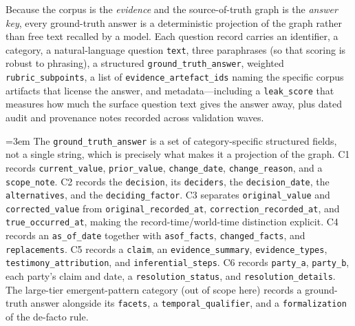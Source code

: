 Because the corpus is the \emph{evidence} and the source-of-truth graph is the
\emph{answer key}, every ground-truth answer is a deterministic projection of the
graph rather than free text recalled by a model. Each question record carries an
identifier, a category, a natural-language question \texttt{text}, three
paraphrases (so that scoring is robust to phrasing), a structured
\texttt{ground\_truth\_answer}, weighted \texttt{rubric\_subpoints}, a list of
\texttt{evidence\_artefact\_ids} naming the specific corpus artifacts that
license the answer, and metadata---including a \texttt{leak\_score} that measures
how much the surface question text gives the answer away, plus dated audit and
provenance notes recorded across validation waves.

{\sloppy\emergencystretch=3em
The \texttt{ground\_truth\_answer} is a set of category-specific structured
fields, not a single string, which is precisely what makes it a projection of
the graph. C1 records \texttt{current\_value}, \texttt{prior\_value},
\texttt{change\_date}, \texttt{change\_reason}, and a \texttt{scope\_note}. C2
records the \texttt{decision}, its \texttt{deciders}, the \texttt{decision\_date},
the \texttt{alternatives}, and the \texttt{deciding\_factor}. C3 separates
\texttt{original\_value} and \texttt{corrected\_value} from
\texttt{original\_recorded\_at}, \texttt{correction\_recorded\_at}, and
\texttt{true\_occurred\_at}, making the record-time/world-time distinction
explicit. C4 records an \texttt{as\_of\_date} together with \texttt{asof\_facts},
\texttt{changed\_facts}, and \texttt{replacements}. C5 records a \texttt{claim},
an \texttt{evidence\_summary}, \texttt{evidence\_types},
\texttt{testimony\_attribution}, and \texttt{inferential\_steps}. C6 records
\texttt{party\_a}, \texttt{party\_b}, each party's claim and date, a
\texttt{resolution\_status}, and \texttt{resolution\_details}. The large-tier
emergent-pattern category (out of scope here) records a ground-truth answer
alongside its \texttt{facets}, a \texttt{temporal\_qualifier}, and a
\texttt{formalization} of the de-facto rule.
\par}

